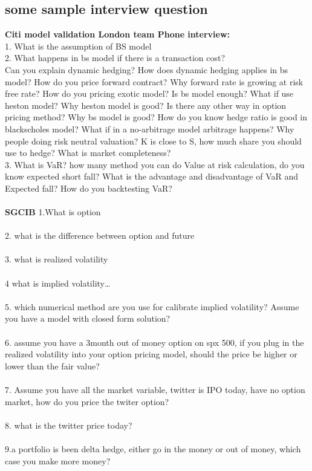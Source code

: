 \documentclass[a4paper,11pt]{article}
\begin{document}
\subsection{some sample interview question}
{\bf Citi model validation London team Phone interview:}\\
1.	What is the assumption of BS model\\
2.	What happens in bs model if there is a transaction cost?\\
Can you explain dynamic hedging? How does dynamic hedging applies in bs model? How do you price forward contract? Why forward rate is growing at risk free rate? How do you pricing exotic model? Is bs model enough? What if use heston model? Why heston model is good? Is there any other way in option pricing method? Why bs model is good? How do you know hedge ratio is good in blackscholes model?  What if in a no-arbitrage model arbitrage happens? Why people doing risk neutral valuation? K is close to S, how much share you should use to hedge? What is market completeness?\\
3.	What is VaR? how many method you can do Value at risk calculation, do you know expected short fall? What is the advantage and disadvantage of VaR and Expected fall?  How do you backtesting VaR?\\\\
{\bf SGCIB}
1.What is option\\\\
2. what is the difference between option and future\\\\
3. what is realized volatility\\\\
4 what is implied volatility…\\\\
5. which numerical method are you use for calibrate implied volatility? Assume you have a model with closed form solution?\\\\
6. assume you have a 3month out of money option on spx 500, if you plug in the realized volatility into your option pricing model, should the price be higher or lower than the fair value?\\\\
7. Assume you have all the market variable, twitter is IPO today, have no option market, how do you price the twiter option?\\\\
8. what is the twitter price today?\\\\
9.a portfolio is been delta hedge, either go in the money or out of money, which case you make more money?\\\\
\end{document}

